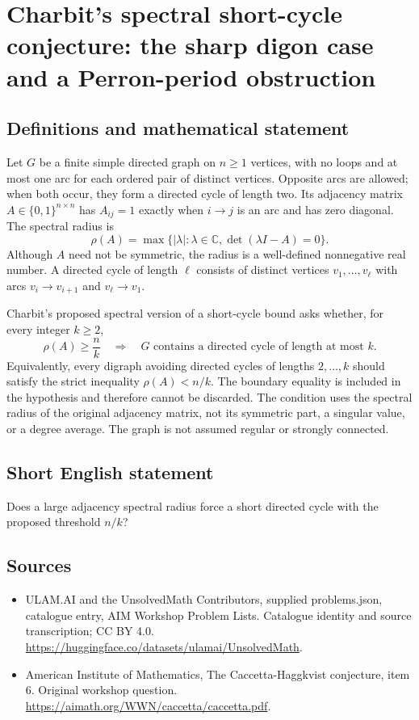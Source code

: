 \documentclass[11pt,a4paper]{article}
\begin{document}
\section*{Charbit's spectral short-cycle conjecture: the sharp digon case and a Perron-period obstruction}\label{statement}

\subsection{Definitions and mathematical statement}
Let $G$ be a finite simple directed graph on $n\geq1$ vertices, with no loops and at most one arc for each ordered pair of distinct vertices.
Opposite arcs are allowed; when both occur, they form a directed cycle of length two.
Its adjacency matrix $A\in\{0,1\}^{n\times n}$ has $A_{ij}=1$ exactly when $i\to j$ is an arc and has zero diagonal.
The spectral radius is
\[
 \rho(A)=\max\{|\lambda|:\lambda\in\mathbb C,
                       \det(\lambda I-A)=0\}.
\]
Although $A$ need not be symmetric, the radius is a well-defined nonnegative real number.
A directed cycle of length $\ell$ consists of distinct vertices $v_1,\ldots,v_\ell$ with arcs $v_i\to v_{i+1}$ and $v_\ell\to v_1$.

Charbit's proposed spectral version of a short-cycle bound asks whether, for every integer $k\geq2$,
\[
 \rho(A)\geq\frac nk
 \quad\Longrightarrow\quad
 G\text{ contains a directed cycle of length at most }k.
\]
Equivalently, every digraph avoiding directed cycles of lengths $2,\ldots,k$ should satisfy the strict inequality $\rho(A)<n/k$.
The boundary equality is included in the hypothesis and therefore cannot be discarded.
The condition uses the spectral radius of the original adjacency matrix, not its symmetric part, a singular value, or a degree average.
The graph is not assumed regular or strongly connected.
\subsection{Short English statement}
Does a large adjacency spectral radius force a short directed cycle with the proposed threshold $n/k$?
\subsection{Sources}
\begin{itemize}
\item[S1] ULAM.AI and the UnsolvedMath Contributors, supplied problems.json, catalogue entry, AIM Workshop Problem Lists. Catalogue identity and source transcription; CC BY 4.0.
\url{https://huggingface.co/datasets/ulamai/UnsolvedMath}.
\item[S2] American Institute of Mathematics, The Caccetta-Haggkvist conjecture, item 6. Original workshop question.
\url{https://aimath.org/WWN/caccetta/caccetta.pdf}.
\end{itemize}
\end{document}
